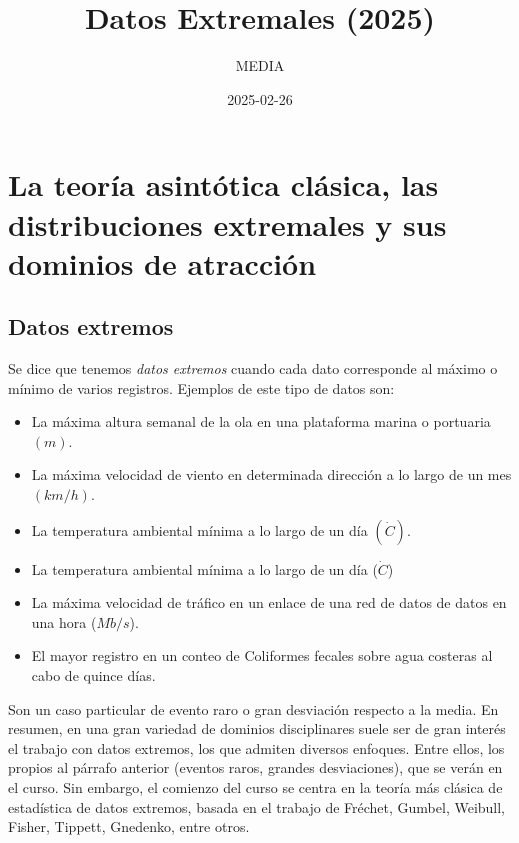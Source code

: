 \documentclass[
]{book}
\title{Datos Extremales (2025)}
\author{MEDIA}
\date{2025-02-26}
\providecommand{\tightlist}{%
  \setlength{\itemsep}{0pt}\setlength{\parskip}{0pt}}
\theoremstyle{definition}
\theoremstyle{definition}
\theoremstyle{definition}
\theoremstyle{definition}
\theoremstyle{remark}
\begin{document}
\maketitle

{
\setcounter{tocdepth}{1}
\tableofcontents
}
\chapter{La teoría asintótica clásica, las distribuciones extremales y sus dominios de atracción}\label{la-teoruxeda-asintuxf3tica-cluxe1sica-las-distribuciones-extremales-y-sus-dominios-de-atracciuxf3n}

\section{Datos extremos}\label{datos-extremos}

Se dice que tenemos \emph{datos extremos} cuando cada
dato corresponde al máximo o mínimo de varios
registros. Ejemplos de este tipo de datos son:

\begin{itemize}
\tightlist
\item
  La máxima altura semanal de la ola en una
  plataforma marina o portuaria \((m)\).
\item
  La máxima velocidad de viento en determinada
  dirección a lo largo de un mes \((km/h)\).
\item
  La temperatura ambiental mínima a lo largo de
  un día \((\dot{C})\).
\item
  La temperatura ambiental mínima a lo largo de
  un día (\(\dot{C}\))
\item
  La máxima velocidad de tráfico en un enlace de
  una red de datos de datos en una hora (\(Mb/s\)).
\item
  El mayor registro en un conteo de Coliformes
  fecales sobre agua costeras al cabo de quince días.
\end{itemize}

Son un caso particular de evento raro o gran
desviación respecto a la media.
En resumen, en una gran variedad de dominios
disciplinares suele ser de gran interés el trabajo
con datos extremos, los que admiten diversos
enfoques. Entre ellos, los propios al párrafo
anterior (eventos raros, grandes desviaciones), que
se verán en el curso.
Sin embargo, el comienzo del curso se centra en la
teoría más clásica de estadística de datos extremos,
basada en el trabajo de Fréchet, Gumbel, Weibull,
Fisher, Tippett, Gnedenko, entre otros.
\end{document}
